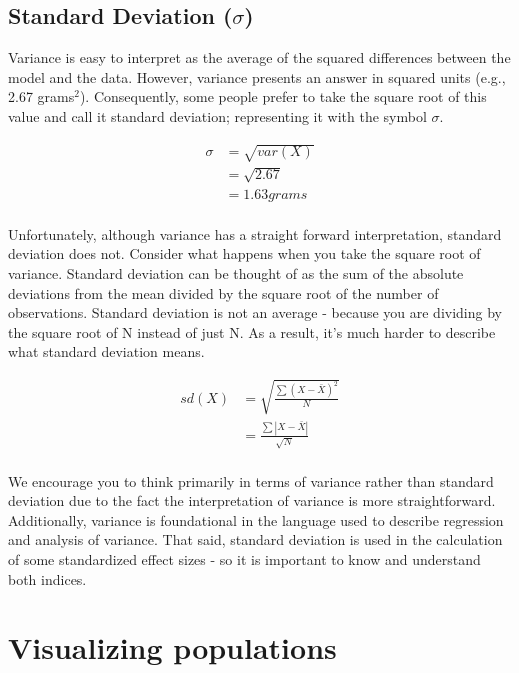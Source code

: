 \documentclass[
]{krantz}
\begin{document}
\hypertarget{standard-deviation-sigma}{%
\subsection{\texorpdfstring{Standard Deviation (\(\sigma\))}{Standard Deviation (\textbackslash sigma)}}\label{standard-deviation-sigma}}

Variance is easy to interpret as the average of the squared differences between the model and the data. However, variance presents an answer in squared units (e.g., 2.67 grams\(^2\)). Consequently, some people prefer to take the square root of this value and call it standard deviation; representing it with the symbol \(\sigma\).

\[
\begin{aligned} 
\sigma &= \sqrt{var(X)} \\
&= \sqrt{2.67} \\
&= 1.63 grams\\
\end{aligned} 
\]

Unfortunately, although variance has a straight forward interpretation, standard deviation does not. Consider what happens when you take the square root of variance. Standard deviation can be thought of as the sum of the absolute deviations from the mean divided by the square root of the number of observations. Standard deviation is not an average - because you are dividing by the square root of N instead of just N. As a result, it's much harder to describe what standard deviation means.

\[
\begin{aligned} 
sd(X) &= \sqrt{\frac{\sum{(X - \bar{X})^2}}{N}}\\
 &= \frac{\sum{|X - \bar{X}|}}{\sqrt{N}}\\
\end{aligned} 
\]

We encourage you to think primarily in terms of variance rather than standard deviation due to the fact the interpretation of variance is more straightforward. Additionally, variance is foundational in the language used to describe regression and analysis of variance. That said, standard deviation is used in the calculation of some standardized effect sizes - so it is important to know and understand both indices.

\hypertarget{visualizing-populations}{%
\section{Visualizing populations}\label{visualizing-populations}}
\end{document}
